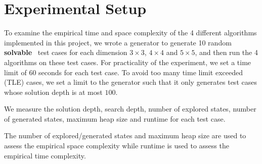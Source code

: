\documentclass{llncs}
\begin{document}
\section{Experimental Setup}
To examine the empirical time and space complexity of the 4 different algorithms implemented in this project, we wrote a generator to generate 10 random \textbf{solvable}~\cite{solvable} test cases for each dimension $3 \times 3$, $4 \times 4$ and $5 \times 5$, and then run the 4 algorithms on these test cases. For practicality of the experiment, we set a time limit of $60$ seconds for each test case. To avoid too many time limit exceeded (TLE) cases, we set a limit to the generator such that it only generates test cases whose solution depth is at most $100$.

We measure the solution depth, search depth, number of explored states, number of generated states, maximum heap size and runtime for each test case.

The number of explored/generated states and maximum heap size are used to assess the empirical space complexity while runtime is used to assess the empirical time complexity.
\end{document}
